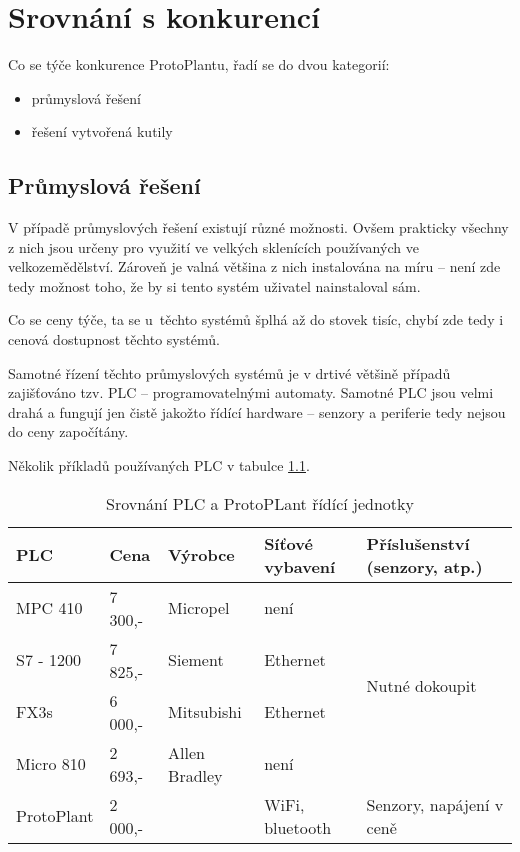 \chapter{Srovnání s konkurencí}
Co se týče konkurence ProtoPlantu, řadí se do dvou kategorií:
\begin{itemize} 
    \item průmyslová řešení
    \item řešení vytvořená kutily
\end{itemize}

\section{Průmyslová řešení}
V případě průmyslových řešení existují různé možnosti.
Ovšem prakticky všechny z nich jsou určeny pro využití ve velkých sklenících používaných ve velkozemědělství.
Zároveň je valná většina z nich instalována na míru -- není zde tedy možnost toho, že by si tento systém uživatel nainstaloval sám.

Co se ceny týče, ta se u~těchto systémů šplhá až do stovek tisíc, chybí zde tedy i cenová dostupnost těchto systémů.

Samotné řízení těchto průmyslových systémů je v drtivé většině případů zajišťováno tzv. PLC -- programovatelnými automaty.
Samotné PLC jsou velmi drahá a fungují jen čistě jakožto řídící hardware -- senzory a periferie tedy nejsou do ceny započítány.

Několik příkladů používaných PLC v tabulce \ref{table:plc_pricing}.
\begin{table}
    \centering
    \caption{Srovnání PLC a ProtoPLant řídící jednotky}
    \begin{tabular}{lllll}
    PLC        & Cena     & Výrobce       & Síťové vybavení & Příslušenství 
    (senzory, atp.)     \\
    \hline
    MPC 410\cite{MicropelPLC}    & 7 300,- & Micropel      & není            & \multirow{4}{*}{Nutné dokoupit }  \\
    S7 - 1200\cite{S7-1200PLC}   & 7 825,-   & Siement       & Ethernet        &                                   \\
    FX3s\cite{FX3sPLC}           & 6 000,-   & Mitsubishi    & Ethernet        &                                   \\
    Micro 810\cite{Micro810PLC}  & 2 693,-   & Allen Bradley & není            &                                   \\
    \hline
    ProtoPlant                   & 2 000,-   &               & WiFi, bluetooth & Senzory, napájení v ceně         
    \end{tabular}
    \label{table:plc_pricing}
    \end{table}

